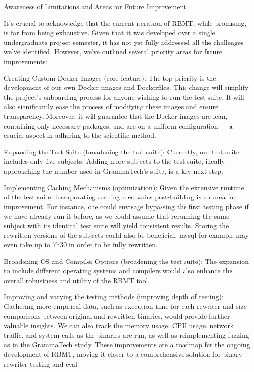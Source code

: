 \documentclass[a4paper,11pt,oneside]{report}
\begin{document}
Awareness of Limitations and Areas for Future Improvement

It's crucial to acknowledge that the current iteration of RBMT, while promising, is far
from being exhaustive. Given that it was developed over a single undergraduate project
semester, it has not yet fully addressed all the challenges we've identified. However, we've
outlined several priority areas for future improvements:

Creating Custom Docker Images (core feature): The top priority is the development
of our own Docker images and Dockerfiles. This change will simplify the project's
onboarding process for anyone wishing to run the test suite. It will also significantly ease the
process of modifying these images and ensure transparency. Moreover, it will guarantee
that the Docker images are lean, containing only necessary packages, and are on a uniform
configuration — a crucial aspect in adhering to the scientific method.

Expanding the Test Suite (broadening the test suite): Currently, our test suite
includes only five subjects. Adding more subjects to the test suite, ideally approaching the
number used in GrammaTech's suite, is a key next step.

Implementing Caching Mechanisms (optimization): Given the extensive runtime of
the test suite, incorporating caching mechanics post-building is an area for improvement.
For instance, one could envisage bypassing the first testing phase if we have already run it
before, as we could assume that rerunning the same subject with its identical test suite will
yield consistent results. Storing the rewritten versions of the subjects could also be
beneficial, mysql for example may even take up to 7h30 in order to be fully rewritten.

Broadening OS and Compiler Options (broadening the test suite): The expansion
to include different operating systems and compilers would also enhance the overall
robustness and utility of the RBMT tool.

Improving and varying the testing methods (improving depth of testing):
Gathering more empirical data, such as execution time for each rewriter and size
comparisons between original and rewritten binaries, would provide further valuable
insights. We can also track the memory usage, CPU usage, network traffic, and system calls
as the binaries are run, as well as reimplementing fuzzing as in the GrammaTech study.
These improvements are a roadmap for the ongoing development of RBMT, moving
it closer to a comprehensive solution for binary rewriter testing and eval
\end{document}

